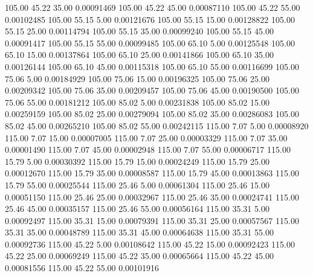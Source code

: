     105.00     45.22     35.00     0.00091469
    105.00     45.22     45.00     0.00087110
    105.00     45.22     55.00     0.00102485
    105.00     55.15      5.00     0.00121676
    105.00     55.15     15.00     0.00128822
    105.00     55.15     25.00     0.00114794
    105.00     55.15     35.00     0.00099240
    105.00     55.15     45.00     0.00091417
    105.00     55.15     55.00     0.00099485
    105.00     65.10      5.00     0.00125548
    105.00     65.10     15.00     0.00137864
    105.00     65.10     25.00     0.00141866
    105.00     65.10     35.00     0.00126144
    105.00     65.10     45.00     0.00115318
    105.00     65.10     55.00     0.00116699
    105.00     75.06      5.00     0.00184929
    105.00     75.06     15.00     0.00196325
    105.00     75.06     25.00     0.00209342
    105.00     75.06     35.00     0.00209457
    105.00     75.06     45.00     0.00190500
    105.00     75.06     55.00     0.00181212
    105.00     85.02      5.00     0.00231838
    105.00     85.02     15.00     0.00259159
    105.00     85.02     25.00     0.00279094
    105.00     85.02     35.00     0.00286083
    105.00     85.02     45.00     0.00265210
    105.00     85.02     55.00     0.00242115
    115.00      7.07      5.00     0.00008920
    115.00      7.07     15.00     0.00007005
    115.00      7.07     25.00     0.00003329
    115.00      7.07     35.00     0.00001490
    115.00      7.07     45.00     0.00002948
    115.00      7.07     55.00     0.00006717
    115.00     15.79      5.00     0.00030392
    115.00     15.79     15.00     0.00024249
    115.00     15.79     25.00     0.00012670
    115.00     15.79     35.00     0.00008587
    115.00     15.79     45.00     0.00013863
    115.00     15.79     55.00     0.00025544
    115.00     25.46      5.00     0.00061304
    115.00     25.46     15.00     0.00051150
    115.00     25.46     25.00     0.00032967
    115.00     25.46     35.00     0.00024741
    115.00     25.46     45.00     0.00035157
    115.00     25.46     55.00     0.00056164
    115.00     35.31      5.00     0.00092497
    115.00     35.31     15.00     0.00079391
    115.00     35.31     25.00     0.00057567
    115.00     35.31     35.00     0.00048789
    115.00     35.31     45.00     0.00064638
    115.00     35.31     55.00     0.00092736
    115.00     45.22      5.00     0.00108642
    115.00     45.22     15.00     0.00092423
    115.00     45.22     25.00     0.00069249
    115.00     45.22     35.00     0.00065664
    115.00     45.22     45.00     0.00081556
    115.00     45.22     55.00     0.00101916
